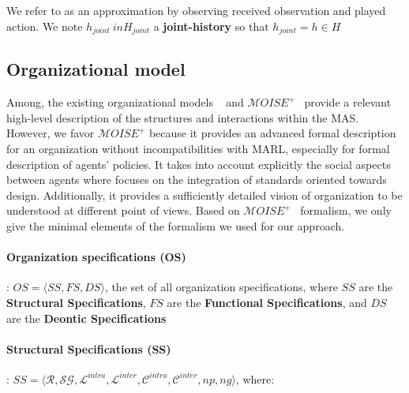 \documentclass[runningheads]{llncs}
\begin{document}
We refer to  as an approximation by observing received observation and played action. We note $h_{joint} \ in H_{joint}$ a \textbf{joint-history} so that $h_{joint} = {h \in H}$

\subsection{Organizational model}

Among, the existing organizational models ~\cite{Ferber2004} and $\mathcal{M}OISE^+$~\cite{Hubner2002} provide a relevant high-level description of the structures and interactions within the MAS. However, we favor $\mathcal{M}OISE^+$ because it provides an advanced formal description for an organization without incompatibilities with MARL, especially for formal description of agents' policies. It takes into account explicitly the social aspects between agents where  focuses on the integration of standards oriented towards design. Additionally, it provides a sufficiently detailed vision of organization to be understood at different point of views.
Based on $\mathcal{M}OISE^+$~\cite{Hubner2007} formalism, we only give the minimal elements of the formalism we used for our approach.

\paragraph{\textbf{Organization specifications (OS)}}: $OS = \langle SS, FS, DS \rangle$, the set of all organization specifications, where $SS$ are the \textbf{Structural Specifications}, $FS$ are the \textbf{Functional Specifications}, and $DS$ are the \textbf{Deontic Specifications}

\paragraph{\textbf{Structural Specifications (SS)}}: $SS = \langle \mathcal{R}, \mathcal{SG}, \mathcal{L}^{intra}, \mathcal{L}^{inter}, \mathcal{C}^{intra}, \mathcal{C}^{inter}, np, ng \rangle$, where:
\end{document}
